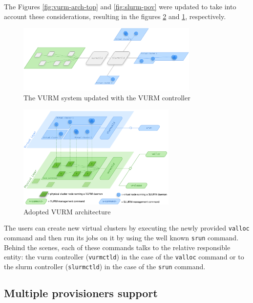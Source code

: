 The Figures \ref{fig:vurm-arch-top} and \ref{fig:slurm-pov} were updated to take into account these considerations, resulting in the figures \ref{fig:vurm-arch-bottom} and \ref{fig:slurm-vurm-pov}, respectively.

\begin{figure}[ht]
	\centering
	\includegraphics[width=0.8\textwidth]{figures/slurm-vurm-pov}
	\caption{The VURM system updated with the VURM controller}
	\label{fig:slurm-vurm-pov}
\end{figure}

\begin{figure}[ht]
	\centering
	\includegraphics[width=0.7\textwidth]{figures/vurm-arch-top-down}
	\caption{Adopted VURM architecture}
	\label{fig:vurm-arch-bottom}
\end{figure}

The users can create new virtual clusters by executing the newly provided \texttt{valloc} command and then run its jobs on it by using the well known \texttt{srun} command. Behind the scenes, each of these commands talks to the relative responsible entity: the \gls{vurm} controller (\texttt{vurmctld}) in the case of the \texttt{valloc} command or to the \gls{slurm} controller (\texttt{slurmctld}) in the case of the \texttt{srun} command.


\subsection{Multiple provisioners support}
\label{sec:multiple-provisioners}

